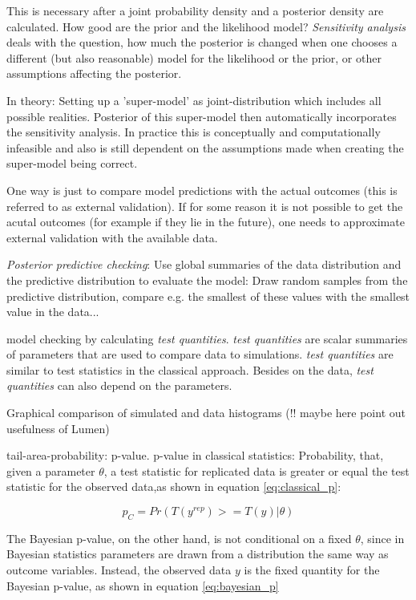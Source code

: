 \documentclass{article}
\begin{document}
This is necessary after a joint probability density and a posterior density are calculated. How good are the prior and the likelihood model?
\textit{Sensitivity analysis} deals with the question, how much the posterior is changed when one chooses a different (but also reasonable) model for the likelihood or the prior, or other assumptions affecting the posterior.

In theory: Setting up a 'super-model' as joint-distribution which includes all possible realities. Posterior of this super-model then automatically incorporates the sensitivity analysis. In practice this is conceptually and computationally infeasible and also is still dependent on the assumptions made when creating the super-model being correct.

One way is just to compare model predictions with the actual outcomes (this is referred to as external validation). If for some reason it is not possible to get the acutal outcomes (for example if they lie in the future), one needs to approximate external validation with the available data.

\textit{Posterior predictive checking}: Use global summaries of the data distribution and the predictive distribution to evaluate the model: Draw random samples from the predictive distribution, compare e.g. the smallest of these values with the smallest value in the data...

model checking by calculating \textit{test quantities}. \textit{test quantities} are scalar summaries of parameters that are used to compare data to simulations. \textit{test quantities} are similar to test statistics in the classical approach. Besides on the data, \textit{test quantities} can also depend on the parameters.

Graphical comparison of simulated and data histograms (!! maybe here point out usefulness of Lumen)

tail-area-probability: p-value. p-value in classical statistics: Probability, that, given a parameter $\theta$, a test statistic for replicated data is greater or equal the test statistic for the observed data,as shown in equation \ref{eq:classical_p}:

\begin{equation}
p_C = Pr(T(y^{rep}) >= T(y) | \theta)
\label{eq:classical_p}
\end{equation}

\cite{1439840954}

The Bayesian p-value, on the other hand, is not conditional on a fixed $\theta$, since in Bayesian statistics parameters are drawn from a distribution the same way as outcome variables. Instead, the observed data $y$ is the fixed quantity for the Bayesian p-value, as shown in equation \ref{eq:bayesian_p}
\end{document}
